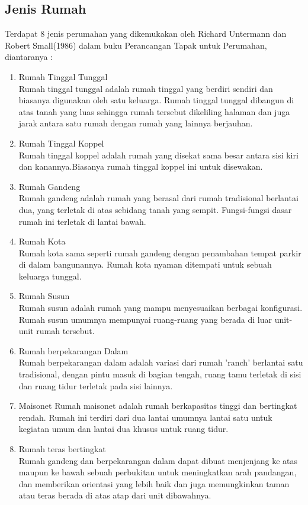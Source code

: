 \subsection{Jenis Rumah}
Terdapat 8 jenis perumahan yang dikemukakan oleh Richard Untermann dan Robert Small(1986) dalam buku Perancangan Tapak untuk Perumahan, diantaranya :
\begin{enumerate}
	\item Rumah Tinggal Tunggal \\
Rumah tinggal tunggal adalah rumah tinggal yang berdiri sendiri dan biasanya digunakan oleh satu keluarga. Rumah tinggal tunggal dibangun di atas tanah yang luas sehingga rumah tersebut dikeliling halaman dan juga jarak antara satu rumah dengan rumah yang lainnya berjauhan.
	\item Rumah Tinggal Koppel \\
Rumah tinggal koppel adalah rumah yang disekat sama besar antara sisi kiri dan kanannya.Biasanya rumah tinggal koppel ini untuk disewakan.
	\item Rumah Gandeng \\
Rumah gandeng adalah rumah yang berasal dari rumah tradisional berlantai dua, yang terletak di atas sebidang tanah yang sempit. Fungsi-fungsi dasar rumah ini terletak di lantai bawah.
	\item Rumah Kota \\
Rumah kota sama seperti rumah gandeng dengan penambahan tempat parkir di dalam bangunannya. Rumah kota nyaman ditempati untuk sebuah keluarga tunggal.
	\item Rumah Susun \\
Rumah susun adalah rumah yang mampu menyesuaikan berbagai konfigurasi. Rumah susun umumnya mempunyai ruang-ruang yang berada di luar unit-unit rumah tersebut.
	\item Rumah berpekarangan Dalam \\
Rumah berpekarangan dalam adalah variasi dari rumah 'ranch' berlantai satu tradisional, dengan pintu masuk di bagian tengah, ruang tamu terletak di sisi dan ruang tidur terletak pada sisi lainnya.
	\item Maisonet
Rumah maisonet adalah rumah berkapasitas tinggi dan bertingkat rendah. Rumah ini terdiri dari dua lantai umumnya lantai satu untuk kegiatan umum dan lantai dua khusus untuk ruang tidur.
	\item Rumah teras bertingkat \\
Rumah gandeng dan berpekarangan dalam dapat dibuat menjenjang ke atas maupun ke bawah sebuah perbukitan untuk meningkatkan arah pandangan, dan memberikan orientasi yang lebih baik dan juga memungkinkan taman atau teras berada di atas atap dari unit dibawahnya.
	
\end{enumerate}
